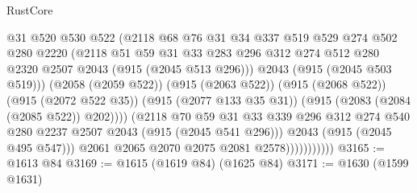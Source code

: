 \begin{lexlean}{RustCore}
\begin{coremodule}
                                @31
                                @520
                                @530
                                @522
                                (@2118
                                  @68
                                  @76
                                  @31
                                  @34
                                  @337
                                  @519
                                  @529
                                  @274
                                  @502
                                  @280
                                  @2220
                                  (@2118
                                    @51
                                    @59
                                    @31
                                    @33
                                    @283
                                    @296
                                    @312
                                    @274
                                    @512
                                    @280
                                    @2320
                                    @2507
                                    @2043
                                    (@915 (@2045 @513 @296)))
                                  @2043
                                  (@915 (@2045 @503 @519)))
                                (@2058 (@2059 @522))
                                (@915 (@2063 @522))
                                (@915 (@2068 @522))
                                (@915 (@2072 @522 @35))
                                (@915 (@2077 @133 @35 @31))
                                (@915 (@2083 (@2084 (@2085 @522)) @202))))
                            (@2118
                              @70
                              @59
                              @31
                              @33
                              @339
                              @296
                              @312
                              @274
                              @540
                              @280
                              @2237
                              @2507
                              @2043
                              (@915 (@2045 @541 @296)))
                            @2043
                            (@915 (@2045 @495 @547)))
                          @2061
                          @2065
                          @2070
                          @2075
                          @2081
                          @2578)))))))))))
@3165 := @1613 @84
@3169 := @1615 (@1619 @84) (@1625 @84)
@3171 := @1630 (@1599 @1631)

\end{coremodule}
\end{lexlean}

